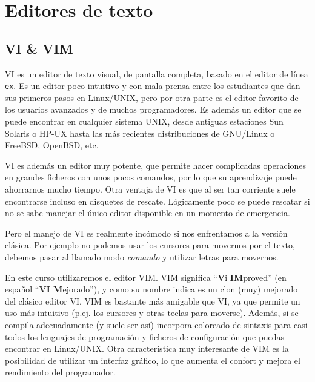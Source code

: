 

\chapter{Editores de texto}
\label{editores.tex}


\section{VI \& VIM}



{\sf VI} es un editor de texto visual, de pantalla completa, basado en
el editor de  línea {\tt ex}. Es  un editor poco intuitivo  y con mala
prensa entre los estudiantes que dan sus primeros pasos en Linux/UNIX,
pero por otra parte es el  editor favorito de los usuarios avanzados y
de muchos programadores. Es además un editor que se puede encontrar en
cualquier sistema UNIX, desde antiguas  estaciones Sun Solaris o HP-UX
hasta  las  más  recientes  distribuciones  de  GNU/Linux  o  FreeBSD,
OpenBSD, etc.

{\sf  VI}  es  además  un   editor  muy  potente,  que  permite  hacer
complicadas operaciones  en grandes ficheros con  unos pocos comandos,
por lo que su aprendizaje  puede ahorrarnos mucho tiempo. Otra ventaja
de {\sf VI}  es que al ser tan corriente  suele encontrarse incluso en
disquetes de rescate. Lógicamente poco se puede rescatar si no se sabe
manejar el único editor disponible en un momento de emergencia.

Pero el manejo de {\sf VI}  es realmente incómodo si nos enfrentamos a
la  versión clásica.  Por ejemplo  no podemos  usar los  cursores para
movernos por el  texto, debemos pasar al llamado modo  {\em comando} y
utilizar letras para movernos.

En este  curso utilizaremos el  editor {\sf VIM}. {\sf  VIM} significa
``{\bf V}i {\bf IM}proved'' (en español ``{\bf VI M}ejorado''), y como
su nombre  indica es un  clon (muy)  mejorado del clásico  editor {\sf
VI}. {\sf VIM}  es bastante más amigable que {\sf  VI}, ya que permite
un uso más intuitivo (p.ej. los cursores y otras teclas para moverse).
Además,  si  se compila  adecuadamente  (y  suele ser  así)  incorpora
coloreado de sintaxis para casi  todos los lenguajes de programación y
ficheros  de configuración  que puedas  encontrar en  Linux/UNIX. Otra
característica  muy interesante  de  {\sf VIM}  es  la posibilidad  de
utilizar un  interfaz gráfico, lo que  aumenta el confort y  mejora el
rendimiento del programador.

